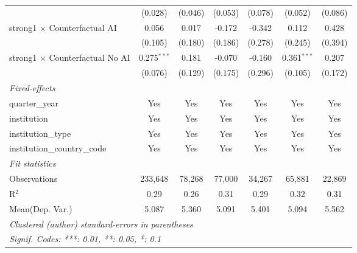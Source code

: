 \begin{tabular}{lcccccc}
                                          & (0.028)       & (0.046)       & (0.053)       & (0.078)       & (0.052)       & (0.086)\\   
   strong1 $\times$ Counterfactual AI     & 0.056         & 0.017         & -0.172        & -0.342        & 0.112         & 0.428\\   
                                          & (0.105)       & (0.180)       & (0.186)       & (0.278)       & (0.245)       & (0.394)\\   
   strong1 $\times$ Counterfactual No AI  & 0.275$^{***}$ & 0.181         & -0.070        & -0.160        & 0.361$^{***}$ & 0.207\\   
                                          & (0.076)       & (0.129)       & (0.175)       & (0.296)       & (0.105)       & (0.172)\\   
   \midrule
   \emph{Fixed-effects}\\
   quarter\_year                          & Yes           & Yes           & Yes           & Yes           & Yes           & Yes\\  
   institution                            & Yes           & Yes           & Yes           & Yes           & Yes           & Yes\\  
   institution\_type                      & Yes           & Yes           & Yes           & Yes           & Yes           & Yes\\  
   institution\_country\_code             & Yes           & Yes           & Yes           & Yes           & Yes           & Yes\\  
   \midrule
   \emph{Fit statistics}\\
   Observations                           & 233,648       & 78,268        & 77,000        & 34,267        & 65,881        & 22,869\\  
   R$^2$                                  & 0.29          & 0.26          & 0.31          & 0.29          & 0.32          & 0.31\\  
Mean(Dep. Var.) & 5.087 & 5.360 & 5.091 & 5.401 & 5.094 & 5.562 \\
   \midrule \midrule
   \multicolumn{7}{l}{\emph{Clustered (author) standard-errors in parentheses}}\\
   \multicolumn{7}{l}{\emph{Signif. Codes: ***: 0.01, **: 0.05, *: 0.1}}\\
\end{tabular}
\par\endgroup
